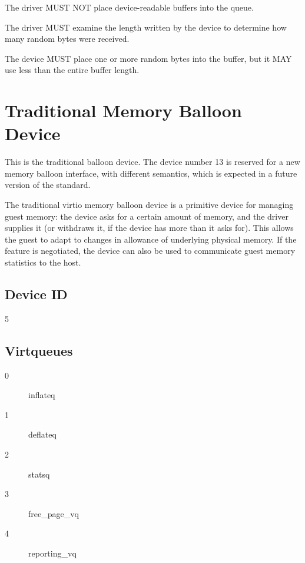 
The driver MUST NOT place device-readable buffers into the queue.

The driver MUST examine the length written by the device to determine
how many random bytes were received.


The device MUST place one or more random bytes into the buffer, but it
MAY use less than the entire buffer length.

\section{Traditional Memory Balloon Device}\label{sec:Device Types / Memory Balloon Device}

This is the traditional balloon device.  The device number 13 is
reserved for a new memory balloon interface, with different
semantics, which is expected in a future version of the standard.

The traditional virtio memory balloon device is a primitive device for
managing guest memory: the device asks for a certain amount of
memory, and the driver supplies it (or withdraws it, if the device
has more than it asks for). This allows the guest to adapt to
changes in allowance of underlying physical memory. If the
feature is negotiated, the device can also be used to communicate
guest memory statistics to the host.

\subsection{Device ID}\label{sec:Device Types / Memory Balloon Device / Device ID}
  5

\subsection{Virtqueues}\label{sec:Device Types / Memory Balloon Device / Virtqueues}
\begin{description}
\item[0] inflateq
\item[1] deflateq
\item[2] statsq
\item[3] free_page_vq
\item[4] reporting_vq
\end{description}

